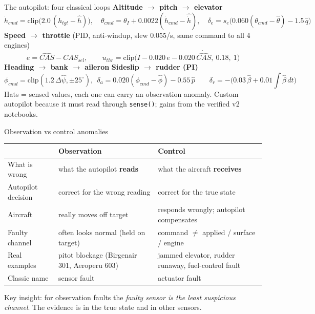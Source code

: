 \documentclass[aspectratio=169,11pt]{beamer}
\newcommand{\obs}[1]{{\color{flight}\textbf{#1}}}
\newcommand{\ctl}[1]{{\color{twin}\textbf{#1}}}
\newcommand{\aside}[1]{{\color{muted}\small #1}}
\begin{document}
\begin{frame}{The autopilot: four classical loops}
  \small
  \textbf{Altitude $\rightarrow$ pitch $\rightarrow$ elevator}
  \[
    \dot h_{cmd} = \mathrm{clip}\big(2.0\,(h_{tgt} - \hat h)\big),\quad
    \theta_{cmd} = \theta_I + 0.0022(\dot h_{cmd} - \hat{\dot h}),\quad
    \delta_e = s_e\big(0.060(\theta_{cmd} - \hat\theta) - 1.5\,\hat q\big)
  \]
  \textbf{Speed $\rightarrow$ throttle} (PID, anti-windup, slew 0.055/s, same command to all 4 engines)
  \[
    e = \widehat{CAS} - CAS_{sel},\qquad u_{thr} = \mathrm{clip}\big(I - 0.020\,e - 0.020\,\dot{\widehat{CAS}},\ 0.18,\ 1\big)
  \]
  \textbf{Heading $\rightarrow$ bank $\rightarrow$ aileron} \qquad \textbf{Sideslip $\rightarrow$ rudder (PI)}
  \[
    \phi_{cmd} = \mathrm{clip}(1.2\,\Delta\hat\psi, \pm25^\circ),\ \ \delta_a = 0.020(\phi_{cmd} - \hat\phi) - 0.55\,\hat p
    \qquad
    \delta_r = -\big(0.03\,\hat\beta + 0.01\!\int\!\hat\beta\,dt\big)
  \]
  \vspace{0.2em}
  \aside{Hats = sensed values, each one can carry an observation anomaly. Custom autopilot because it must read through \texttt{sense()}; gains from the verified v2 notebooks.}
\end{frame}

\begin{frame}{Observation vs control anomalies}
  \small
  \begin{tabularx}{\textwidth}{@{}l L L@{}}
    \toprule
    & \obs{Observation} & \ctl{Control} \\
    \midrule
    What is wrong & what the autopilot \textbf{reads} & what the aircraft \textbf{receives} \\
    Autopilot decision & correct for the wrong reading & correct for the true state \\
    Aircraft & really moves off target & responds wrongly; autopilot compensates \\
    Faulty channel & often looks normal (held on target) & command $\neq$ applied / surface / engine \\
    Real examples & pitot blockage (Birgenair 301, Aeroperu 603) & jammed elevator, rudder runaway, fuel-control fault \\
    Classic name & sensor fault & actuator fault \\
    \bottomrule
  \end{tabularx}
  \vspace{1em}
  \begin{block}{}
    Key insight: for observation faults the \emph{faulty sensor is the least suspicious channel}. The evidence is in the true state and in other sensors.
  \end{block}
\end{frame}
\end{document}
